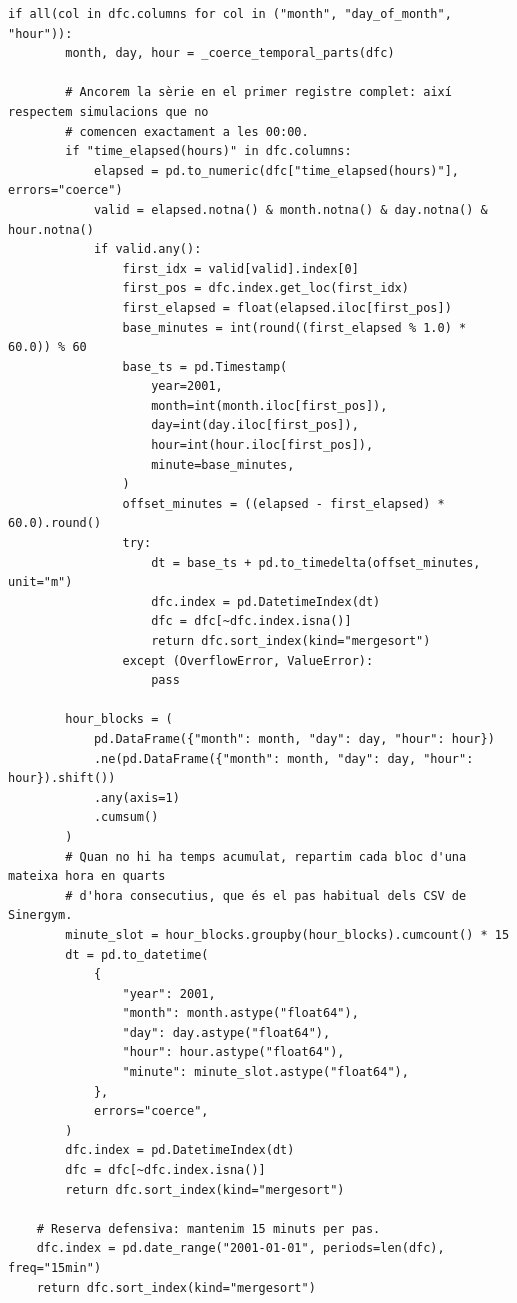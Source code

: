 \documentclass[10pt,a4paper]{article}
\begin{document}
\begin{lstlisting}[style=studioPython,caption={backend/grafics/time\_utils.py},label={lst:backend-grafics-time-utils-py}]
    if all(col in dfc.columns for col in ("month", "day_of_month", "hour")):
        month, day, hour = _coerce_temporal_parts(dfc)

        # Ancorem la sèrie en el primer registre complet: així respectem simulacions que no
        # comencen exactament a les 00:00.
        if "time_elapsed(hours)" in dfc.columns:
            elapsed = pd.to_numeric(dfc["time_elapsed(hours)"], errors="coerce")
            valid = elapsed.notna() & month.notna() & day.notna() & hour.notna()
            if valid.any():
                first_idx = valid[valid].index[0]
                first_pos = dfc.index.get_loc(first_idx)
                first_elapsed = float(elapsed.iloc[first_pos])
                base_minutes = int(round((first_elapsed % 1.0) * 60.0)) % 60
                base_ts = pd.Timestamp(
                    year=2001,
                    month=int(month.iloc[first_pos]),
                    day=int(day.iloc[first_pos]),
                    hour=int(hour.iloc[first_pos]),
                    minute=base_minutes,
                )
                offset_minutes = ((elapsed - first_elapsed) * 60.0).round()
                try:
                    dt = base_ts + pd.to_timedelta(offset_minutes, unit="m")
                    dfc.index = pd.DatetimeIndex(dt)
                    dfc = dfc[~dfc.index.isna()]
                    return dfc.sort_index(kind="mergesort")
                except (OverflowError, ValueError):
                    pass

        hour_blocks = (
            pd.DataFrame({"month": month, "day": day, "hour": hour})
            .ne(pd.DataFrame({"month": month, "day": day, "hour": hour}).shift())
            .any(axis=1)
            .cumsum()
        )
        # Quan no hi ha temps acumulat, repartim cada bloc d'una mateixa hora en quarts
        # d'hora consecutius, que és el pas habitual dels CSV de Sinergym.
        minute_slot = hour_blocks.groupby(hour_blocks).cumcount() * 15
        dt = pd.to_datetime(
            {
                "year": 2001,
                "month": month.astype("float64"),
                "day": day.astype("float64"),
                "hour": hour.astype("float64"),
                "minute": minute_slot.astype("float64"),
            },
            errors="coerce",
        )
        dfc.index = pd.DatetimeIndex(dt)
        dfc = dfc[~dfc.index.isna()]
        return dfc.sort_index(kind="mergesort")

    # Reserva defensiva: mantenim 15 minuts per pas.
    dfc.index = pd.date_range("2001-01-01", periods=len(dfc), freq="15min")
    return dfc.sort_index(kind="mergesort")


\end{lstlisting}
\end{document}
